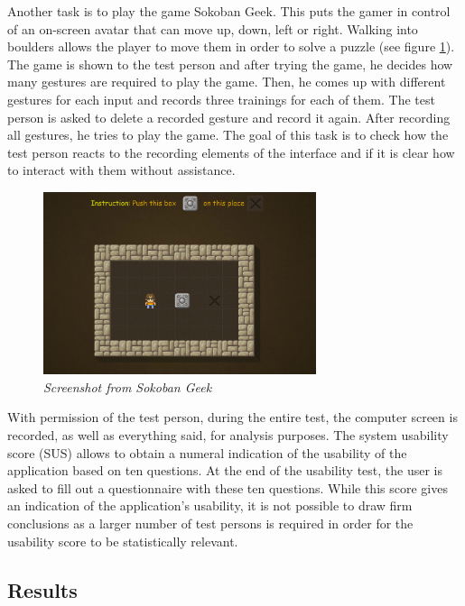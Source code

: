Another task is to play the game Sokoban Geek. This puts the gamer in control of an on-screen avatar that can move up, down, left or right. Walking into boulders allows the player to move them in order to solve a puzzle (see figure \ref{fig: sokoban_geek}). The game is shown to the test person and after trying the game, he decides how many gestures are required to play the game. Then, he comes up with different gestures for each input and records three trainings for each of them. The test person is asked to delete a recorded gesture and record it again. After recording all gestures, he tries to play the game. The goal of this task is to check how the test person reacts to the recording elements of the interface and if it is clear how to interact with them without assistance.\\

\begin{figure}[H]
\begin{center}
\includegraphics[width=8cm]{SokobanGeek.png}
\caption{\emph{Screenshot from Sokoban Geek}}
\label{fig: sokoban_geek}
\end{center}
\end{figure}

With permission of the test person, during the entire test, the computer screen is recorded, as well as everything said, for analysis purposes. The system usability score (SUS) allows to obtain a numeral indication of the usability of the application based on ten questions. At the end of the usability test, the user is asked to fill out a questionnaire with these ten questions. While this score gives an indication of the application's usability, it is not possible to draw firm conclusions as a larger number of test persons is required in order for the usability score to be statistically relevant.


\subsection{Results}

